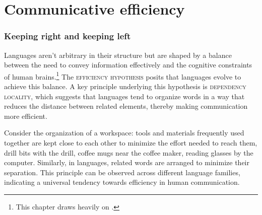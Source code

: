 \chapter{Communicative efficiency}




\subsection{Keeping right and keeping left}

Languages aren't arbitrary in their structure but are shaped by a balance between the need to convey information effectively and the cognitive constraints of human brains.\footnote{This chapter draws heavily on \citet{Futrell2020}.} The \textsc{efficiency hypothesis} posits that languages evolve to achieve this balance. A key principle underlying this hypothesis is \textsc{dependency locality}, which suggests that languages tend to organize words in a way that reduces the distance between related elements, thereby making communication more efficient.

Consider the organization of a workspace: tools and materials frequently used together are kept close to each other to minimize the effort needed to reach them, drill bits with the drill, coffee mugs near the coffee maker, reading glasses by the computer. Similarly, in languages, related words are arranged to minimize their separation. This principle can be observed across different language families, indicating a universal tendency towards efficiency in human communication.

